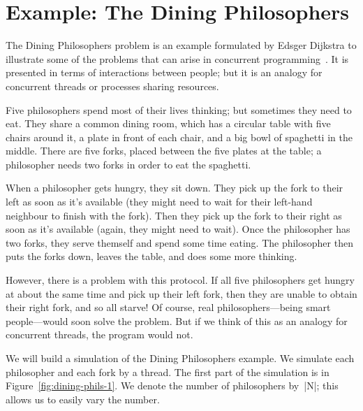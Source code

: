 \section{Example: The Dining Philosophers}

The Dining Philosophers problem is an
example formulated by Edsger Dijkstra to illustrate some of the problems that
can arise in concurrent programming~\cite{dining-phils}.  It is presented in
terms of interactions between people; but it is an analogy for concurrent
threads or processes sharing resources.

Five philosophers spend most of their lives thinking; but sometimes they need
to eat.  They share a common dining room, which has a circular table with five
chairs around it, a plate in front of each chair, and a big bowl of spaghetti
in the middle.  There are five forks, placed between the five plates at the
table; a philosopher needs two forks in order to eat the spaghetti. 

When a philosopher gets hungry, they sit down.  They pick up the fork to their
left as soon as it's available (they might need to wait for their left-hand
neighbour to finish with the fork).  Then they pick up the fork to their right
as soon as it's available (again, they might need to wait).  Once the
philosopher has two forks, they serve themself and spend some time eating.
The philosopher then puts the forks down, leaves the table, and does some more
thinking.

However, there is a problem with this protocol.  If all five philosophers get
hungry at about the same time and pick up their left fork, then they are
unable to obtain their right fork, and so all starve!  Of course, real
philosophers---being smart people---would soon solve the problem.  But if we
think of this as an analogy for concurrent threads, the program would not.

We will build a simulation of the Dining Philosophers example.  We 
simulate each philosopher and each fork by a thread.  The first part of the
simulation is in Figure~\ref{fig:dining-phils-1}.  We denote the number of
philosophers by~|N|; this allows us to easily vary the number. 


